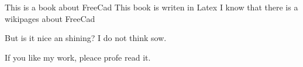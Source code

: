 \documentclass{article}
\begin{document}

This is a book about FreeCad 
This book is writen in Latex 
I know that there is a wikipages about FreeCad

But is it nice an shining? I do not think sow. 

If you like my work, pleace profe read it. 



\lipsum[1-20]
\end{document}
